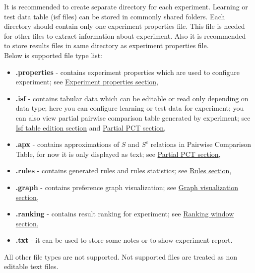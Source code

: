 It is recommended to create separate directory for each experiment. Learning or test data table (isf files) can be stored in commonly shared folders. Each directory should contain only one experiment properties file. This file is needed for other files to extract information about experiment. Also it is recommended to store results files in same directory as experiment properties file.\\

Below is supported file type list:
\begin{itemize}
	\item \textbf{.properties} - contains experiment properties which are used to configure experiment; see \hyperref[section:properties]{Experiment properties section},
	\item \textbf{.isf} - contains tabular data which can be editable or read only depending on data type; here you can configure learning or test data for experiment; you can also view partial pairwise comparison table generated by experiment;
	see \hyperref[section:isf-table]{Isf table edition section} and  \hyperref[sub:pct-isf]{Partial PCT section},
	\item \textbf{.apx} - contains approximations of $S$ and $S^{c}$ relations in Pairwise Comparison Table, for now it is only displayed as text;
	see \hyperref[sub:pct-apx]{Partial PCT section},
	\item \textbf{.rules} - contains generated rules and rules statistics;
	see \hyperref[section:rules]{Rules section},
	\item \textbf{.graph} - contains preference graph visualization;
	see \hyperref[section:graph]{Graph visualization section},
	\item \textbf{.ranking} - contains result ranking for experiment;
	see \hyperref[section:ranking]{Ranking window section},
	\item \textbf{.txt} - it can be used to store some notes or to show experiment report.
\end{itemize}

All other file types are not supported. Not supported files are treated as non editable text files.

\vfill\newpage